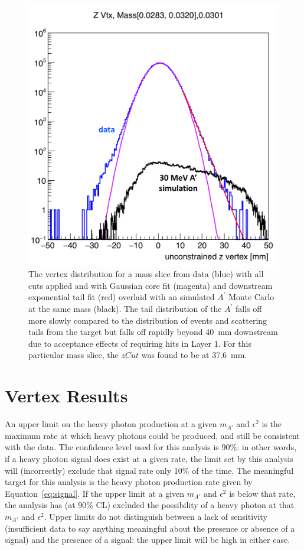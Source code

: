 \documentclass[twocolumn, showpacs, preprintnumbers,prd, superscriptaddress]{revtex4-1}
\begin{document}
        \begin{figure}[th]
            \centering
            \includegraphics[width=.9\linewidth]{figs/aprimeTailPlot.png}
            \caption{
                The vertex distribution for a mass slice from data (blue) with all cuts applied and with Gaussian core fit (magenta) and downstream exponential tail fit (red) overlaid with an simulated $A^{\prime}$ Monte Carlo at the same mass (black). The tail distribution of the $A^{\prime}$ falls off more slowly compared to the distribution of events and scattering tails from the target but falls off rapidly beyond 40~mm downstream due to acceptance effects of requiring hits in Layer 1. For this particular mass slice, the $zCut$ was found to be at 37.6~mm.}
            \label{fig:aprimedistribution}
        \end{figure}
    
    \section{Vertex Results}\label{sec:vertexresults}
    
        An upper limit on the heavy photon production at a given $m_{A'}$ and $\epsilon^2$ is the maximum rate at which heavy photons could be produced, and still be consistent with the data. The confidence level used for this analysis is 90\%: in other words, if a heavy photon signal does exist at a given rate, the limit set by this analysis will (incorrectly) exclude that signal rate only 10\% of the time. The meaningful target for this analysis is the heavy photon production rate given by Equation~\eqref{eq:signal}. If the upper limit at a given $m_{A'}$ and $\epsilon^2$ is below that rate, the analysis has (at 90\% CL) excluded the possibility of a heavy photon at that $m_{A'}$ and $\epsilon^2$. Upper limits do not distinguish between a lack of sensitivity (insufficient data to say anything meaningful about the presence or absence of a signal) and the presence of a signal: the upper limit will be high in either case.
\end{document}
